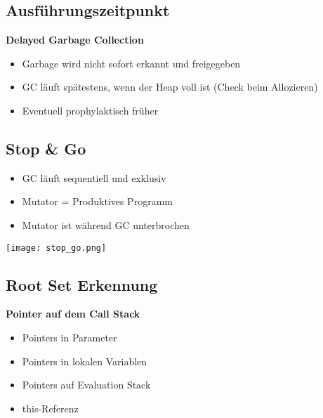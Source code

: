 \subsection{Ausführungszeitpunkt}
\textbf{Delayed Garbage Collection}
\begin{itemize}
    \item Garbage wird nicht sofort erkannt und freigegeben
    \item GC läuft spätestens, wenn der Heap voll ist (Check beim Allozieren)
    \item Eventuell prophylaktisch früher
\end{itemize}

\subsection{Stop \& Go}
\begin{itemize}
    \item GC läuft sequentiell und exklusiv
    \item Mutator = Produktives Programm
    \item Mutator ist während GC unterbrochen
\end{itemize}
\texttt{[image: stop\_go.png]}

\subsection{Root Set Erkennung}
\textbf{Pointer auf dem Call Stack}
\begin{itemize}
    \item Pointers in Parameter
    \item Pointers in lokalen Variablen
    \item Pointers auf Evaluation Stack
    \item this-Referenz
\end{itemize}

